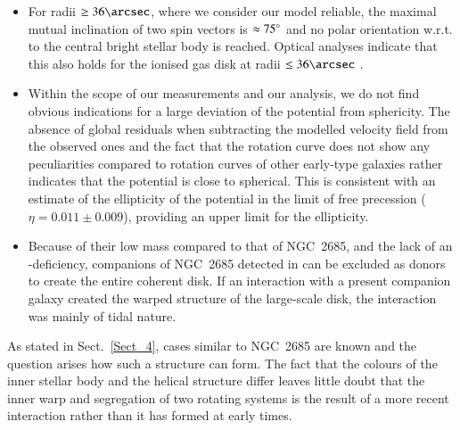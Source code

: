 \documentclass[oldversion]{aa}
\renewcommand{\deg}{\hbox{$^\circ$}}
\begin{document}
\begin{itemize}
{two regimes each of which shares a common line-of-nodes
\citep[][]{Briggs90}. Hence, the disk is co-precessing (or not
precessing) in both regimes. The disk is coherent, hence both regimes
are connected by a small transition region. In the transition region
the nodal line progresses in the direction of rotation, as was
previously found by \citet[][]{Briggs90} for other galaxies. The outer
disk of NGC~2685 is flat out to a radius of about $420\arcsec\,
\hat{=} \, 31\, \rm kpc$.
}
\item{
For radii $\geq 36\arcsec$, where we consider our model reliable, the
maximal mutual inclination of two spin vectors is $\approx75\deg$ and
no polar orientation w.r.t. to the central bright stellar body is
reached.  Optical analyses indicate that this also holds for the
ionised gas disk at radii $\leq 36\arcsec$ \citep[][]{Sarzi06}.
}
\item
{
Within the scope of our measurements and our analysis, 
we do not find obvious indications for a large deviation of the
potential from sphericity. The absence of global residuals when
subtracting the modelled velocity field from the observed ones and the
fact that the rotation curve does not show any peculiarities compared
to rotation curves of other early-type galaxies rather indicates that
the potential is close to spherical. This is consistent with an
estimate of the ellipticity of the potential in the limit of free
precession ($\eta = 0.011 \pm 0.009 $), providing an upper limit for
the ellipticity.
}
\item
{
Because of their low  mass compared to that of NGC~2685,
and the lack of an -deficiency, companions of NGC~2685
detected in  can be excluded as donors to create the entire
coherent  disk. If an interaction with a present companion
galaxy created the warped structure of the large-scale disk, the
interaction was mainly of tidal nature.
}
\end{itemize}
As stated in Sect.~\ref{Sect_4}, cases similar to NGC~2685 are known
and the question arises how such a structure can form. The fact that
the colours of the inner stellar body and the helical structure differ
\citep[][]{Peletier93} leaves little doubt that the inner warp and
segregation of two rotating systems is the result of a more recent
interaction rather than it has formed at early times.
\end{document}
